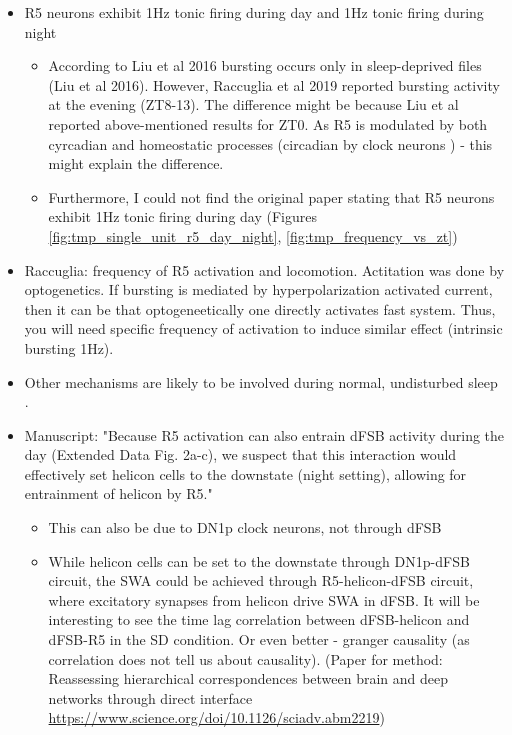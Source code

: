 \documentclass[../main.tex]{subfiles}
\begin{document}
\begin{itemize}
    \item R5 neurons exhibit 1Hz tonic firing during day and 1Hz tonic firing during night
    \begin{itemize}
        \item According to Liu et al 2016 bursting occurs only in sleep-deprived files (Liu et al 2016). However,
        Raccuglia et al 2019 reported bursting activity at the evening (ZT8-13). The difference might be because
        Liu et al reported above-mentioned results for ZT0. As R5 is modulated by both cyrcadian and homeostatic
        processes (circadian by clock neurons \parencite{doppSinglecellTranscriptomicsReveals2024})
        - this might explain the difference.
        \item Furthermore, I could not find the original paper stating that R5 neurons
        exhibit 1Hz tonic firing during day (Figures \ref{fig:tmp_single_unit_r5_day_night}, \ref{fig:tmp_frequency_vs_zt})
    \end{itemize}

    \item Raccuglia: frequency of R5 activation and locomotion. Actitation was done by optogenetics. If bursting is
    mediated by hyperpolarization activated current, then it can be that optogeneetically one directly
    activates fast system. Thus, you will need specific frequency of activation to induce similar
    effect (intrinsic bursting 1Hz).

    \item Other mechanisms are likely to be involved during normal, undisturbed sleep \parencite{liuSleepDriveEncoded2016}.
    
    \item Manuscript: "Because R5 activation can also entrain
    dFSB activity during the day (Extended Data Fig. 2a-c), we suspect that this interaction would
    effectively set helicon cells to the downstate (night setting), allowing for entrainment of
    helicon by R5."
    \begin{itemize}
        \item This can also be due to DN1p clock neurons, not through dFSB
        \item While helicon cells can be set to the downstate through DN1p-dFSB circuit,
        the SWA could be achieved through R5-helicon-dFSB circuit, where
        excitatory synapses from helicon drive SWA in dFSB. It will be interesting
        to see the time lag correlation between dFSB-helicon and dFSB-R5 in the SD condition.
        Or even better - granger causality (as correlation does not tell us about causality).
        (Paper for method: 
        Reassessing hierarchical correspondences between brain and deep networks through direct interface
        \url{https://www.science.org/doi/10.1126/sciadv.abm2219})
    \end{itemize}

\end{itemize}
\end{document}
